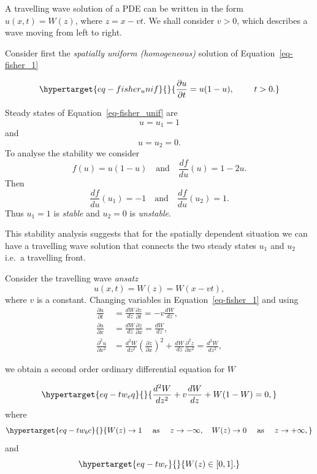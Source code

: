 \documentclass[
  letterpaper,
  DIV=11,
  numbers=noendperiod]{scrreprt}
\theoremstyle{plain}
\theoremstyle{definition}
\theoremstyle{plain}
\theoremstyle{remark}
\begin{document}
A travelling wave solution of a PDE can be written in the form
\(u(x,t) = W(z)\), where \(z = x - vt\). We shall consider \(v>0\),
which describes a wave moving from left to right.

Consider first the \emph{spatially uniform (homogeneous)} solution of
Equation~\ref{eq-fisher_1}

\begin{equation}\protect\hypertarget{eq-fisher_unif}{}{ 
\frac{\partial u}{\partial t} =    u(1-u), \qquad   \, \, t >0.
}\label{eq-fisher_unif}\end{equation}

Steady states of Equation~\ref{eq-fisher_unif} are \[
u=u_1 =1
\] and \[
u=u_2 =0.
\] To analyse the stability we consider \[
f(u)=u(1-u) \quad \textrm{and} \quad \frac{ df}{du}(u)= 1 - 2u.
\] Then \[
\frac{ df}{du}(u_1)= -1 \quad \textrm{and} \quad \frac{ df}{du}(u_2)= 1.
\] Thus \(u_1=1\) is \emph{stable} and \(u_2=0\) is \emph{unstable}.

This stability analysis suggests that for the spatially dependent
situation we can have a travelling wave solution that connects the two
steady states \(u_1\) and \(u_2\) i.e.~a travelling front.

Consider the travelling wave \emph{ansatz}\\
\[
u(x,t)= W(z) = W(x-vt),
\] where \(v\) is a constant. Changing variables in
Equation~\ref{eq-fisher_1} and using \[
\begin{aligned}
\frac{ \partial u}{\partial t} &= \frac{ dW}{dz} \frac{\partial z}{\partial t} = - v   \frac{ dW}{dz}, \\
 \frac{ \partial u}{\partial x} &= \frac{ dW}{dz} \frac{\partial z}{\partial x} =\frac{ dW}{dz}, \\
 \frac{ \partial^2 u}{\partial x^2} &= \frac{ d^2W}{dz^2} \left(\frac{\partial z}{\partial x} \right)^2 +  \frac{ dW}{dz} \frac{\partial^2 z}{\partial x^2} =\frac{ d^2W}{dz^2},
\end{aligned}
\]

we obtain a second order ordinary differential equation for \(W\)

\begin{equation}\protect\hypertarget{eq-tw_eq}{}{
\frac{ d^2W}{dz^2}+  v \frac{ dW}{dz} + W(1-W)  = 0, 
}\label{eq-tw_eq}\end{equation} where
\begin{equation}\protect\hypertarget{eq-tw_bc}{}{
W(z) \to 1 \quad \text{ as } \quad z \to  - \infty, \quad 
W(z) \to 0 \quad \text{ as } \quad z \to  +\infty,
}\label{eq-tw_bc}\end{equation} and
\begin{equation}\protect\hypertarget{eq-tw_r}{}{
W(z) \in [0,1]. 
}\label{eq-tw_r}\end{equation}
\end{document}
